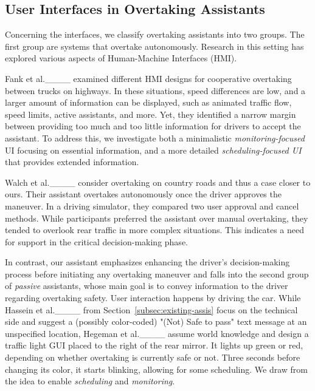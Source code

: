 \subsection{User Interfaces in Overtaking Assistants}\label{subsec:uis-in-existing-assistants}

Concerning the interfaces, we %
classify overtaking assistants into two groups. 
The first group are systems that overtake autonomously. 
Research in this setting has explored various aspects of Human-Machine Interfaces (HMI). 

Fank et al.____ examined different HMI designs for cooperative overtaking between trucks on highways.
In these situations, speed differences are low, and a larger amount of information can be displayed, such as animated traffic flow, speed limits, active assistants, and more.
Yet, they identified a narrow margin between providing too much and too little information for drivers to accept the assistant. 
To address this, we investigate both a minimalistic \textit{monitoring-focused} UI focusing on essential information, and a more detailed \textit{scheduling-focused UI} that provides extended information.


Walch et al.____ consider overtaking on country roads and thus a case closer to ours.
Their assistant overtakes autonomously once the driver approves the maneuver.
In a driving simulator, they compared two user approval and cancel methods. %
While participants preferred the assistant over manual overtaking, they tended to overlook rear traffic in more complex situations. 
This indicates a need for support in the critical decision-making phase. 


In contrast, our assistant emphasizes enhancing the driver's decision-making process before initiating any overtaking maneuver and falls into the second group of \textit{passive} assistants, whose 
main goal is to convey information to the driver regarding overtaking safety. 
User interaction happens by driving the car.
While Hassein et al.____ from Section~\ref{subsec:existing-assis} focus on the technical side and suggest a (possibly color-coded) "(Not) Safe to pass" text message at an unspecified location, Hegeman et al.____ assume world knowledge and design a traffic light GUI placed to the right of the rear mirror. 
It lights up green or red, depending on whether overtaking is currently safe or not. 
Three seconds before changing its color, it starts blinking, allowing for some scheduling. 
We draw from the idea to enable \textit{scheduling} and \textit{monitoring}. 

